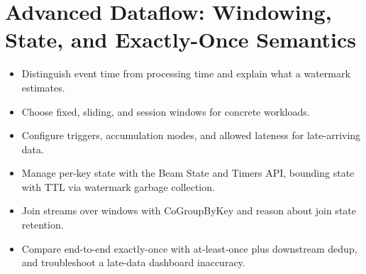 \chapter{Advanced Dataflow: Windowing, State, and Exactly-Once Semantics}

\begin{objectives}
\begin{itemize}
    \item Distinguish event time from processing time and explain what a watermark estimates.
    \item Choose fixed, sliding, and session windows for concrete workloads.
    \item Configure triggers, accumulation modes, and allowed lateness for late-arriving data.
    \item Manage per-key state with the Beam State and Timers API, bounding state with TTL via watermark garbage collection.
    \item Join streams over windows with CoGroupByKey and reason about join state retention.
    \item Compare end-to-end exactly-once with at-least-once plus downstream dedup, and troubleshoot a late-data dashboard inaccuracy.
\end{itemize}
\end{objectives}

